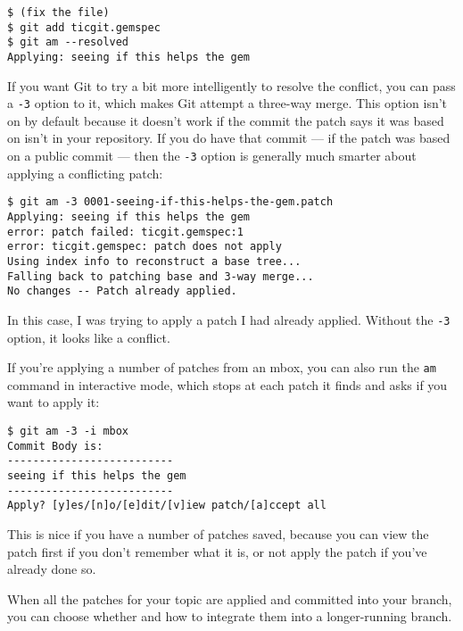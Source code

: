 \documentclass[a4paper]{book}
\begin{document}
\begin{shaded}\begin{verbatim}
$ (fix the file)
$ git add ticgit.gemspec
$ git am --resolved
Applying: seeing if this helps the gem
\end{verbatim}\end{shaded}

If you want Git to try a bit more intelligently to resolve the conflict, you can pass a \texttt{-3} option to it, which makes Git attempt a three-way merge. This option isn't on by default because it doesn't work if the commit the patch says it was based on isn't in your repository. If you do have that commit --- if the patch was based on a public commit --- then the \texttt{-3} option is generally much smarter about applying a conflicting patch:

\begin{shaded}\begin{verbatim}
$ git am -3 0001-seeing-if-this-helps-the-gem.patch
Applying: seeing if this helps the gem
error: patch failed: ticgit.gemspec:1
error: ticgit.gemspec: patch does not apply
Using index info to reconstruct a base tree...
Falling back to patching base and 3-way merge...
No changes -- Patch already applied.
\end{verbatim}\end{shaded}

In this case, I was trying to apply a patch I had already applied. Without the \texttt{-3} option, it looks like a conflict.

If you're applying a number of patches from an mbox, you can also run the \texttt{am} command in interactive mode, which stops at each patch it finds and asks if you want to apply it:

\begin{shaded}\begin{verbatim}
$ git am -3 -i mbox
Commit Body is:
--------------------------
seeing if this helps the gem
--------------------------
Apply? [y]es/[n]o/[e]dit/[v]iew patch/[a]ccept all
\end{verbatim}\end{shaded}

This is nice if you have a number of patches saved, because you can view the patch first if you don't remember what it is, or not apply the patch if you've already done so.

When all the patches for your topic are applied and committed into your branch, you can choose whether and how to integrate them into a longer-running branch.
\end{document}
